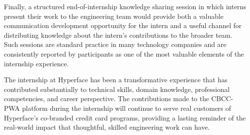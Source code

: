 Finally, a structured end-of-internship knowledge sharing session in which interns present their work to the engineering team would provide both a valuable communication development opportunity for the intern and a useful channel for distributing knowledge about the intern's contributions to the broader team. Such sessions are standard practice in many technology companies and are consistently reported by participants as one of the most valuable elements of the internship experience.

The internship at Hyperface has been a transformative experience that has contributed substantially to technical skills, domain knowledge, professional competencies, and career perspective. The contributions made to the CBCC-PWA platform during the internship will continue to serve real customers of Hyperface's co-branded credit card programs, providing a lasting reminder of the real-world impact that thoughtful, skilled engineering work can have.
